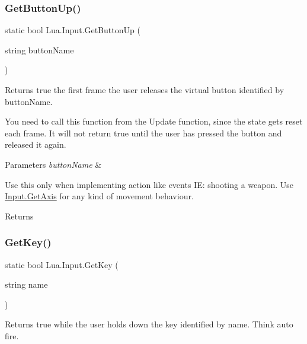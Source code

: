 \subsubsection{\texorpdfstring{GetButtonUp()}{GetButtonUp()}}
{\footnotesize\ttfamily static bool Lua.\+Input.\+Get\+Button\+Up (\begin{DoxyParamCaption}\item[{string}]{button\+Name }\end{DoxyParamCaption})\hspace{0.3cm}{\ttfamily [static]}}



Returns true the first frame the user releases the virtual button identified by button\+Name. 

You need to call this function from the Update function, since the state gets reset each frame. It will not return true until the user has pressed the button and released it again. 
\begin{DoxyParams}{Parameters}
{\em button\+Name} & \\
\hline
\end{DoxyParams}
Use this only when implementing action like events IE\+: shooting a weapon. Use \mbox{\hyperlink{class_lua_1_1_input_a616e22e4f3b9c973c9763c10dc495395}{Input.\+Get\+Axis}} for any kind of movement behaviour. \begin{DoxyReturn}{Returns}

\end{DoxyReturn}
\mbox{\label{class_lua_1_1_input_abf392b3cf9d208f67a6ea02c0288206a}} 
\subsubsection{\texorpdfstring{GetKey()}{GetKey()}}
{\footnotesize\ttfamily static bool Lua.\+Input.\+Get\+Key (\begin{DoxyParamCaption}\item[{string}]{name }\end{DoxyParamCaption})\hspace{0.3cm}{\ttfamily [static]}}



Returns true while the user holds down the key identified by name. Think auto fire. 

